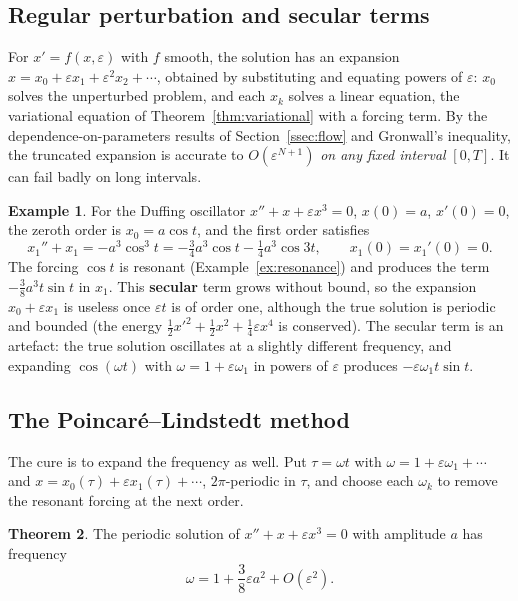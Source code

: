 \documentclass[11pt,a4paper]{article}
\numberwithin{equation}{section}
\theoremstyle{definition}
\newtheorem{thm}{Theorem}[subsection]
\newtheorem{exa}[thm]{Example}
\begin{document}
\subsection{Regular perturbation and secular terms}
\label{ssec:regular}

For $x' = f(x, \varepsilon)$ with $f$ smooth, the solution has an expansion $x = x_0 + \varepsilon x_1 + \varepsilon^2x_2 + \cdots$, obtained by substituting and equating powers of $\varepsilon$: $x_0$ solves the unperturbed problem, and each
$x_k$ solves a linear equation, the variational equation of Theorem~\ref{thm:variational} with a forcing term. By the dependence-on-parameters results of Section~\ref{ssec:flow} and Gronwall's inequality, the
truncated expansion is accurate to $O(\varepsilon^{N+1})$ \emph{on any fixed interval} $[0, T]$. It can fail badly on long intervals.

\begin{exa}
\label{ex:secular}
For the Duffing oscillator $x'' + x + \varepsilon x^3 = 0$, $x(0) = a$, $x'(0) = 0$, the zeroth order is $x_0 = a\cos t$, and the first order satisfies
\[
x_1'' + x_1 = -a^3\cos^3t = -\tfrac34a^3\cos t - \tfrac14a^3\cos3t, \qquad x_1(0) = x_1'(0) = 0 .
\]
The forcing $\cos t$ is resonant (Example~\ref{ex:resonance}) and produces the term $-\frac38a^3t\sin t$ in $x_1$. This \textbf{secular} term grows without bound, so the expansion $x_0 + \varepsilon x_1$ is useless once $\varepsilon t$ is of
order one, although the true solution is periodic and bounded (the energy $\frac12x'^2 + \frac12x^2 + \frac14\varepsilon x^4$ is conserved). The secular term is an artefact: the true solution oscillates at a slightly different
frequency, and expanding $\cos(\omega t)$ with $\omega = 1 + \varepsilon\omega_1$ in powers of $\varepsilon$ produces $-\varepsilon\omega_1t\sin t$.
\end{exa}

\subsection{The Poincar\'e--Lindstedt method}
\label{ssec:lindstedt}

The cure is to expand the frequency as well. Put $\tau = \omega t$ with $\omega = 1 + \varepsilon\omega_1 + \cdots$ and $x = x_0(\tau) + \varepsilon x_1(\tau) + \cdots$, $2\pi$-periodic in $\tau$, and choose each $\omega_k$ to remove the resonant forcing at the
next order.

\begin{thm}
\label{thm:lindstedt}
The periodic solution of $x'' + x + \varepsilon x^3 = 0$ with amplitude $a$ has frequency
\[
\omega = 1 + \frac38\varepsilon a^2 + O(\varepsilon^2) .
\]
\end{thm}
\end{document}

